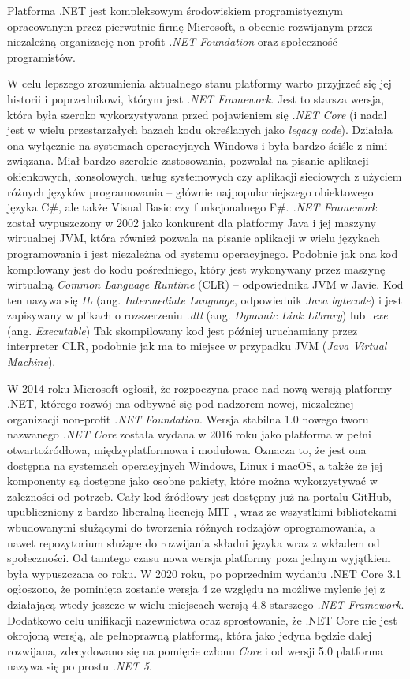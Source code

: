 Platforma .NET jest kompleksowym środowiskiem programistycznym opracowanym przez pierwotnie firmę Microsoft, a obecnie rozwijanym przez niezależną organizację non-profit \emph{.NET Foundation} oraz społeczność programistów.

W celu lepszego zrozumienia aktualnego stanu platformy warto przyjrzeć się jej historii i poprzednikowi, którym jest \emph{.NET Framework}.
Jest to starsza wersja, która była szeroko wykorzystywana przed pojawieniem się \emph{.NET Core} (i nadal jest w wielu przestarzałych bazach kodu określanych jako \emph{legacy code}).
Działała ona wyłącznie na systemach operacyjnych Windows i była bardzo ściśle z nimi związana.
Miał bardzo szerokie zastosowania, pozwalał na pisanie aplikacji okienkowych, konsolowych, usług systemowych czy aplikacji sieciowych z użyciem różnych języków programowania -- głównie najpopularniejszego obiektowego języka C\#, ale także Visual Basic czy funkcjonalnego F\#.
\emph{.NET Framework} został wypuszczony w 2002 jako konkurent dla platformy Java i jej maszyny wirtualnej JVM, która również pozwala na pisanie aplikacji w wielu językach programowania i jest niezależna od systemu operacyjnego.
Podobnie jak ona kod kompilowany jest do kodu pośredniego, który jest wykonywany przez maszynę wirtualną \emph{Common Language Runtime} (CLR) -- odpowiednika JVM w Javie.
Kod ten nazywa się \emph{IL} (ang. \emph{Intermediate Language}, odpowiednik \emph{Java bytecode}) i jest zapisywany w plikach o rozszerzeniu \emph{.dll} (ang. \emph{Dynamic Link Library}) lub \emph{.exe} (ang. \emph{Executable})
Tak skompilowany kod jest później uruchamiany przez interpreter CLR, podobnie jak ma to miejsce w przypadku JVM (\emph{Java Virtual Machine}).

W 2014 roku Microsoft ogłosił, że rozpoczyna prace nad nową wersją platformy .NET, którego rozwój ma odbywać się pod nadzorem nowej, niezależnej organizacji non-profit \emph{.NET Foundation}.
Wersja stabilna 1.0 nowego tworu nazwanego \emph{.NET Core} została wydana w 2016 roku jako platforma w pełni otwartoźródłowa, międzyplatformowa i modułowa.
Oznacza to, że jest ona dostępna na systemach operacyjnych Windows, Linux i macOS, a także że jej komponenty są dostępne jako osobne pakiety, które można wykorzystywać w zależności od potrzeb.
Cały kod źródłowy jest dostępny już na portalu GitHub, upubliczniony z bardzo liberalną licencją MIT \cite{dotnet-sdk-repo, dotnet-runtime-repo}, wraz ze wszystkimi bibliotekami wbudowanymi służącymi do tworzenia różnych rodzajów oprogramowania, a nawet repozytorium służące do rozwijania składni języka wraz z wkładem od społeczności.
Od tamtego czasu nowa wersja platformy poza jednym wyjątkiem była wypuszczana co roku.
W 2020 roku, po poprzednim wydaniu .NET Core 3.1 ogłoszono, że pominięta zostanie wersja 4 ze względu na możliwe mylenie jej z działającą wtedy jeszcze w wielu miejscach wersją 4.8 starszego \emph{.NET Framework}.
Dodatkowo celu unifikacji nazewnictwa oraz sprostowanie, że .NET Core nie jest okrojoną wersją, ale pełnoprawną platformą, która jako jedyna będzie dalej rozwijana, zdecydowano się na pomięcie członu \emph{Core} i od wersji 5.0 platforma nazywa się po prostu \emph{.NET 5}.

